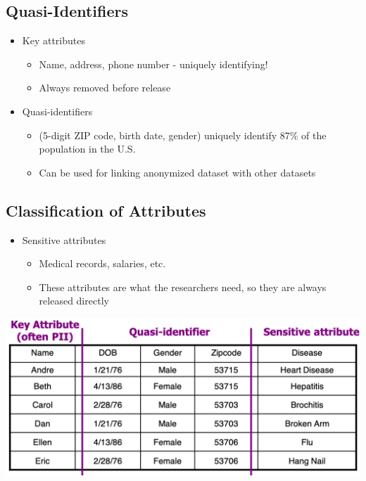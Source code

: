 \documentclass[11pt]{article}
\theoremstyle{definition}
\begin{document}
\subsection{Quasi-Identifiers}
\begin{itemize}
    \item Key attributes
    \begin{itemize}
        \item Name, address, phone number - uniquely identifying!
        \item Always removed before release
    \end{itemize}
    \item Quasi-identifiers
    \begin{itemize}
        \item (5-digit ZIP code, birth date, gender) uniquely identify 87\% of the population in the U.S.
        \item Can be used for linking anonymized dataset with other datasets
    \end{itemize}
\end{itemize}

\subsection{Classification of Attributes}
\begin{itemize}
    \item Sensitive attributes
    \begin{itemize}
        \item Medical records, salaries, etc.
        \item These attributes are what the researchers need, so they are always released directly
    \end{itemize}
\end{itemize}
\includegraphics[width=\textwidth/2]{16.png}
\end{document}
